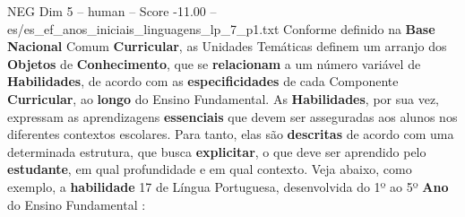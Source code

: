 \begin{textsample}{NEG Dim 5 – human – Score -11.00 – es/es\_ef\_anos\_iniciais\_linguagens\_lp\_7\_p1.txt}  \label{ex:f5_neg_002}
Conforme definido na \textbf{Base} \textbf{Nacional} Comum \textbf{Curricular}, as Unidades Temáticas definem um arranjo dos \textbf{Objetos} de \textbf{Conhecimento}, que se \textbf{relacionam} a um número variável de \textbf{Habilidades}, de acordo com as \textbf{especificidades} de cada Componente \textbf{Curricular}, ao \textbf{longo} do Ensino Fundamental.
As \textbf{Habilidades}, por sua vez, expressam as aprendizagens \textbf{essenciais} que devem ser asseguradas aos alunos nos diferentes contextos escolares.
Para tanto, elas são \textbf{descritas} de acordo com uma determinada estrutura, que busca \textbf{explicitar}, o que deve ser aprendido pelo \textbf{estudante}, em qual profundidade e em qual contexto.
Veja abaixo, como exemplo, a \textbf{habilidade} 17 de Língua Portuguesa, desenvolvida do 1º ao 5º \textbf{Ano} do Ensino Fundamental :

\end{textsample}
